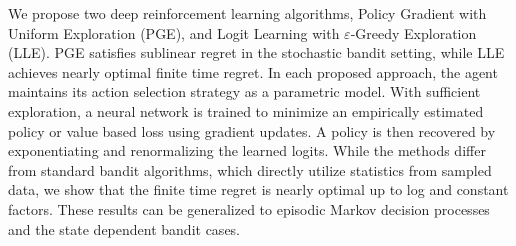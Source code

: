 We propose two deep reinforcement learning algorithms, Policy Gradient with Uniform Exploration (PGE), and Logit Learning with $\varepsilon$-Greedy Exploration (LLE). PGE satisfies sublinear regret in the stochastic bandit setting, while LLE achieves nearly optimal finite time regret. In each proposed approach, the agent maintains its action selection strategy as a parametric model. With sufficient exploration, a neural network is trained to minimize an empirically estimated policy or value based loss using gradient updates. A policy is then recovered by exponentiating and renormalizing the learned logits. While the methods differ from standard bandit algorithms, which directly utilize statistics from sampled data, we show that the finite time regret is nearly optimal up to log and constant factors. These results can be generalized to episodic Markov decision processes and the state dependent bandit cases.
